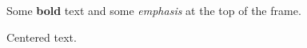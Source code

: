\documentclass[t]{beamer}
\begin{document}
\begin{frame}
Some \textbf{bold} text and some \emph{emphasis} at the top of the frame.
\end{frame}
\begin{frame}[c]
Centered text.
\end{frame}
\end{document}
